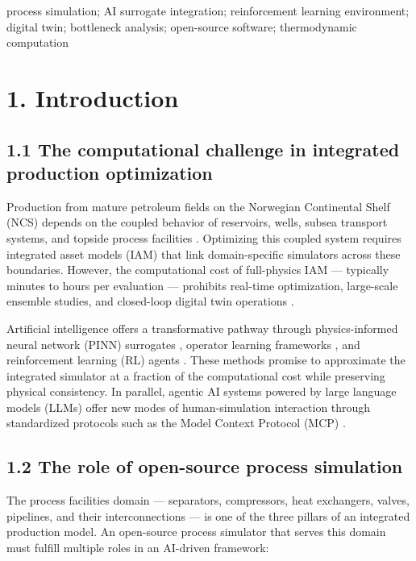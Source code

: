 \documentclass[review,3p]{custom}
\begin{document}
\begin{frontmatter}
\begin{keyword}
process simulation; AI surrogate integration; reinforcement learning environment; digital twin; bottleneck analysis; open-source software; thermodynamic computation
\end{keyword}

\end{frontmatter}

\section{1. Introduction}



\subsection{1.1 The computational challenge in integrated production optimization}

Production from mature petroleum fields on the Norwegian Continental Shelf (NCS) depends on the coupled behavior of reservoirs, wells, subsea transport systems, and topside process facilities \cite{Howell2006, Ng2024}. Optimizing this coupled system requires integrated asset models (IAM) that link domain-specific simulators across these boundaries. However, the computational cost of full-physics IAM --- typically minutes to hours per evaluation --- prohibits real-time optimization, large-scale ensemble studies, and closed-loop digital twin operations \cite{Ng2022a}.

Artificial intelligence offers a transformative pathway through physics-informed neural network (PINN) surrogates \cite{Raissi2019, Karniadakis2021}, operator learning frameworks \cite{Lu2021, Li2021}, and reinforcement learning (RL) agents \cite{Faria2022, Nasir2024}. These methods promise to approximate the integrated simulator at a fraction of the computational cost while preserving physical consistency. In parallel, agentic AI systems powered by large language models (LLMs) offer new modes of human-simulation interaction through standardized protocols such as the Model Context Protocol (MCP) \cite{Anthropic2024MCP, Ferrag2025}.

\subsection{1.2 The role of open-source process simulation}

The process facilities domain --- separators, compressors, heat exchangers, valves, pipelines, and their interconnections --- is one of the three pillars of an integrated production model. An open-source process simulator that serves this domain must fulfill multiple roles in an AI-driven framework:
\end{document}
